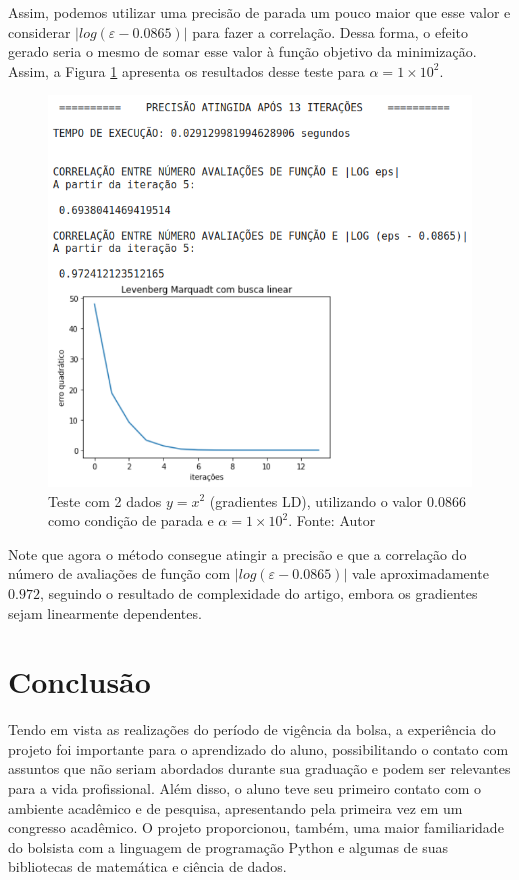 \documentclass[11pt]{article}
\begin{document}
Assim, podemos utilizar uma precisão de parada um pouco maior que esse valor e considerar $|log(\varepsilon - 0.0865)|$ para fazer a correlação. Dessa forma, o efeito gerado seria o mesmo de somar esse valor à função objetivo da minimização. Assim, a Figura \ref{a2sh} apresenta os resultados desse teste para $\alpha = 1\times 10^{2}$.

\begin{figure}[H]
\center
\includegraphics[scale=0.7]{Figuras/a2sh.png}
\caption{Teste com 2 dados $y = x^2$ (gradientes LD), utilizando o valor $0.0866$ como condição de parada e $\alpha = 1\times 10^{2}$. Fonte: Autor} 
\label{a2sh}
\end{figure}

Note que agora o método consegue atingir a precisão e que a correlação do número de avaliações de função com $|log(\varepsilon - 0.0865)|$ vale aproximadamente $0.972$, seguindo o resultado de complexidade do artigo, embora os gradientes sejam linearmente dependentes. 

\section{Conclusão}
Tendo em vista as realizações do período de vigência da bolsa, a experiência do projeto foi importante para o aprendizado do aluno, possibilitando o contato com assuntos que não seriam abordados durante sua graduação e podem ser relevantes para a vida profissional. Além disso, o aluno teve seu primeiro contato com o ambiente acadêmico e de pesquisa, apresentando pela primeira vez em um congresso acadêmico. O projeto proporcionou, também, uma maior familiaridade do bolsista com a linguagem de programação Python e algumas de suas bibliotecas de matemática e ciência de dados.
\end{document}
